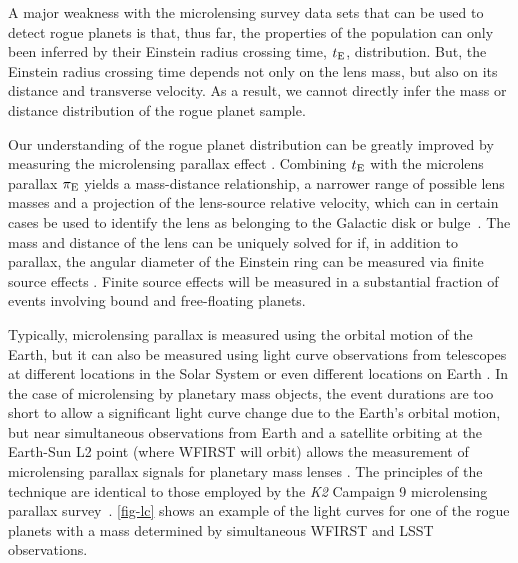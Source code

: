 A major weakness with the microlensing survey data sets that can be used to detect rogue planets is that, thus far, the properties
of the population can only been inferred by their Einstein radius
crossing time, $t_{\rm E}$, distribution. But, the Einstein radius crossing
time depends not only on the lens mass, but also on its distance and
transverse velocity. As a result, we cannot directly infer the mass or distance
distribution of the rogue planet sample.

Our understanding of the rogue planet distribution can be greatly improved
by measuring the microlensing parallax effect \citep{1992ApJ...392..442G,1995ApJ...454L.125A}.
Combining $t_{\rm E}$ with the microlens parallax $\pi_{\rm E}$ yields a mass-distance relationship, a narrower range of possible lens masses and a projection of the lens-source relative velocity, which can in certain cases be used to identify the lens as belonging to the Galactic disk or bulge~\citep{2015ApJ...802...76Y}. The mass and distance of the lens can be uniquely solved for if, in addition to parallax, the angular diameter of the Einstein ring can be measured via finite source effects \citep{1994ApJ...424L..21N}. Finite source effects will be measured in a substantial fraction of events involving bound and free-floating planets.

Typically, microlensing parallax
is measured using the orbital motion of the Earth, but it can also be
measured using light curve observations from telescopes at different locations
in the Solar System \citep{2007ApJ...664..862D,2015ApJ...804...20C} or
even different locations on Earth \citep{2009ApJ...698L.147G}. In the
case of microlensing by planetary mass objects, the event durations are
too short to allow a significant light curve change due to the Earth's
orbital motion, but near simultaneous observations from Earth and a
satellite orbiting at the Earth-Sun L2 point (where WFIRST will orbit) allows the measurement of microlensing parallax signals for planetary mass
lenses \citep{2003ApJ...591L..53G}. The principles of the technique are identical to those employed by the {\it K2} Campaign 9 microlensing parallax survey~\citep{2016PASP..128l4401H,2016AJ....152...96H,2017AJ....153..161P}.
\autoref{fig-lc} shows an example of the light curves for one of the
rogue planets with a mass determined by simultaneous WFIRST and LSST
observations.

